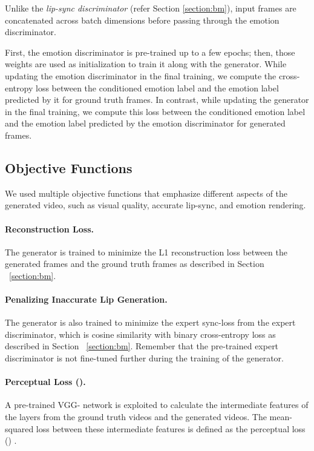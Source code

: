 \documentclass[accepted]{uai2023}
\begin{document}
Unlike the \emph{lip-sync discriminator} (refer Section \ref{section:bm}), input frames are concatenated across batch dimensions before passing through the emotion discriminator.

First, the emotion discriminator is pre-trained up to a few epochs; then, those weights are used as initialization to train it along with the generator. While updating the emotion discriminator in the final training, we compute the cross-entropy loss between the conditioned emotion label and the emotion label predicted by it for ground truth frames. In contrast, while updating the generator in the final training, we compute this loss between the conditioned emotion label and the emotion label predicted by the emotion discriminator for generated frames.

\subsection{Objective Functions}
We used multiple objective functions that emphasize different aspects of the generated video, such as visual quality, accurate lip-sync, and emotion rendering. 

\paragraph{Reconstruction Loss.}
The generator is trained to minimize the L1 reconstruction loss between the generated frames and the ground truth frames as described in Section ~\ref{section:bm}.

\paragraph{Penalizing Inaccurate Lip Generation.}
The generator is also trained to minimize the expert sync-loss  from the expert discriminator, which is cosine similarity with binary cross-entropy loss as described in Section ~\ref{section:bm}.
Remember that the pre-trained expert discriminator is not fine-tuned further during the training of the generator.

\paragraph{Perceptual Loss ().}
A pre-trained VGG- network \citep{simonyan2014very} is exploited to calculate the intermediate features of the layers from the ground truth videos and the generated videos. The mean-squared loss between these intermediate features is defined as the perceptual loss () \citep{johnson2016perceptual}.
\end{document}
